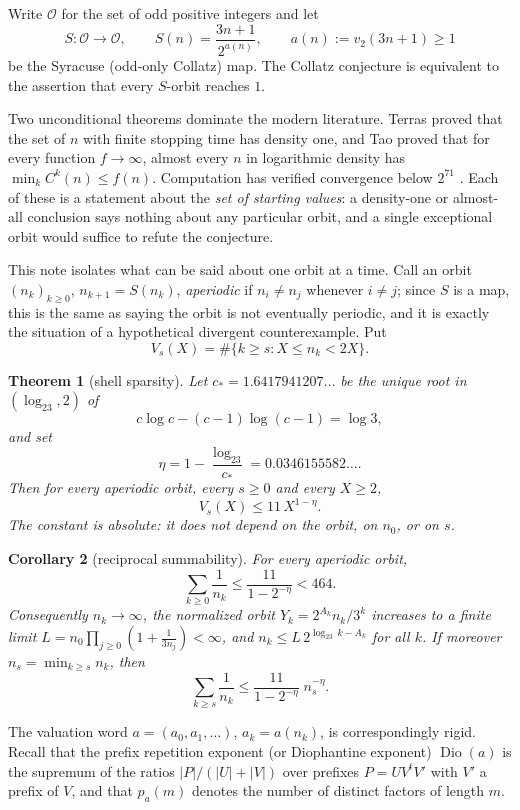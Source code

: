 \documentclass[11pt,reqno]{amsart}
\theoremstyle{plain}
\newtheorem{theorem}{Theorem}[section]
\newtheorem{corollary}[theorem]{Corollary}
\theoremstyle{definition}
\numberwithin{equation}{section}
\newcommand{\Odd}{\mathcal{O}}
\begin{document}
Write $\Odd$ for the set of odd positive integers and let
\[
S:\Odd\to\Odd,\qquad
S(n)=\frac{3n+1}{2^{a(n)}},\qquad a(n):=v_2(3n+1)\ge1
\]
be the Syracuse (odd-only Collatz) map.  The Collatz conjecture is equivalent
to the assertion that every $S$-orbit reaches $1$.

Two unconditional theorems dominate the modern literature.  Terras
\cite{terras1976} proved that the set of $n$ with finite stopping time has
density one, and Tao \cite{tao2022} proved that for every function
$f\to\infty$, almost every $n$ in logarithmic density has
$\min_k C^k(n)\le f(n)$.  Computation has verified convergence below $2^{71}$
\cite{barina2025}.  Each of these is a statement about the \emph{set of
starting values}: a density-one or almost-all conclusion says nothing about
any particular orbit, and a single exceptional orbit would suffice to refute
the conjecture.

This note isolates what can be said about one orbit at a time.  Call an orbit
$(n_k)_{k\ge0}$, $n_{k+1}=S(n_k)$, \emph{aperiodic} if $n_i\ne n_j$ whenever
$i\ne j$; since $S$ is a map, this is the same as saying the orbit is not
eventually periodic, and it is exactly the situation of a hypothetical
divergent counterexample.  Put
\[
V_s(X)=\#\{k\ge s: X\le n_k<2X\}.
\]

\begin{theorem}[shell sparsity]
\label{thm:A}
Let $c_*=1.6417941207\ldots$ be the unique root in $(\log_23,2)$ of
\[
c\log c-(c-1)\log(c-1)=\log3,
\]
and set
\[
\eta=1-\frac{\log_23}{c_*}=0.0346155582\ldots.
\]
Then for every aperiodic orbit, every $s\ge0$ and every $X\ge2$,
\[
V_s(X)\le 11\,X^{1-\eta}.
\]
The constant is absolute: it does not depend on the orbit, on $n_0$, or on $s$.
\end{theorem}

\begin{corollary}[reciprocal summability]
\label{cor:B}
For every aperiodic orbit,
\[
\sum_{k\ge0}\frac1{n_k}\le\frac{11}{1-2^{-\eta}}<464.
\]
Consequently $n_k\to\infty$, the normalized orbit
$Y_k=2^{A_k}n_k/3^k$ increases to a finite limit
$L=n_0\prod_{j\ge0}(1+\tfrac1{3n_j})<\infty$, and $n_k\le L\,2^{\log_23\,k-A_k}$
for all $k$.  If moreover $n_s=\min_{k\ge s}n_k$, then
\[
\sum_{k\ge s}\frac1{n_k}\le\frac{11}{1-2^{-\eta}}\;n_s^{-\eta}.
\]
\end{corollary}

The valuation word $a=(a_0,a_1,\dots)$, $a_k=a(n_k)$, is correspondingly
rigid.  Recall that the prefix repetition exponent (or Diophantine exponent)
$\operatorname{Dio}(a)$ is the supremum of the ratios $|P|/(|U|+|V|)$ over
prefixes $P=UV^tV'$ with $V'$ a prefix of $V$, and that $p_a(m)$ denotes the
number of distinct factors of length $m$.
\end{document}
